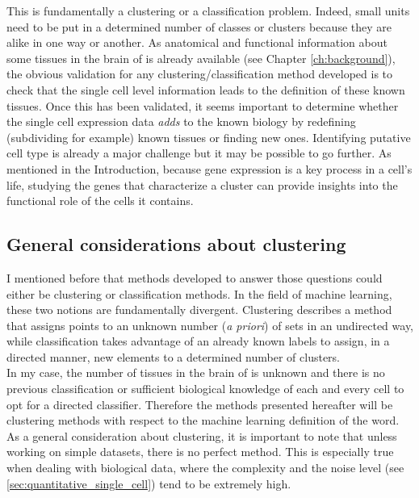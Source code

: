 	This is fundamentally a clustering or a classification problem. Indeed, small units need to be put in a determined number of classes or clusters because they are alike in one way or another. As anatomical and functional information about some tissues in the brain of \platy{} is already available (see Chapter \ref{ch:background}), the obvious validation for any clustering/classification method developed is to check that the single cell level information leads to the definition of these known tissues. Once this has been validated, it seems important to determine whether the single cell expression data \emph{adds} to the known biology by redefining (subdividing for example) known tissues or finding new ones. Identifying putative cell type is already a major challenge but it may be possible to go further. As mentioned in the Introduction, because gene expression is a key process in a cell's life, studying the genes that characterize a cluster can provide insights into the functional role of the cells it contains.

	\subsection{General considerations about clustering}
	I mentioned before that methods developed to answer those questions could either be clustering or classification methods. In the field of machine learning, these two notions are fundamentally divergent. Clustering describes a method that assigns points to an unknown number (\emph{a priori}) of sets in an undirected way, while classification takes advantage of an already known labels to assign, in a directed manner, new elements to a determined number of clusters.\\
	
	In my case, the number of tissues in the brain of \platy{} is unknown and there is no previous classification or sufficient biological knowledge of each and every cell to opt for a directed classifier. Therefore the methods presented hereafter will be clustering methods with respect to the machine learning definition of the word.\\
	
	As a general consideration about clustering, it is important to note that unless working on simple datasets, there is no perfect method. This is especially true when dealing with biological data, where the complexity and the noise level (see \ref{sec:quantitative_single_cell}) tend to be extremely high. \\
	
